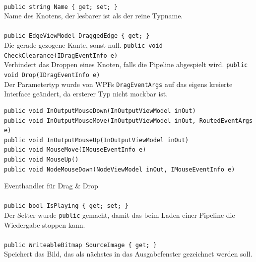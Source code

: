 \paragraph{}
\begin{itemize}
	\add \verb!public string Name { get; set; }! \\
	Name des Knotens, der lesbarer ist als der reine Typname.
\end{itemize}

\paragraph{}
\begin{itemize}
	\add \verb!public EdgeViewModel DraggedEdge { get; }! \\
	Die gerade gezogene Kante, sonst null.
	\add \verb!public void CheckClearance(IDragEventInfo e)! \\
	Verhindert das Droppen eines Knoten, falls die Pipeline abgespielt wird.
	\change \verb!public void Drop(IDragEventInfo e)! \\
	Der Parametertyp wurde von WPFs \verb!DragEventArgs! auf das eigens kreierte Interface  geändert, da ersterer Typ nicht mockbar ist.
	\add \begin{verbatim}
public void InOutputMouseDown(InOutputViewModel inOut)
public void InOutputMouseMove(InOutputViewModel inOut, RoutedEventArgs e)
public void InOutputMouseUp(InOutputViewModel inOut)
public void MouseMove(IMouseEventInfo e)
public void MouseUp()
public void NodeMouseDown(NodeViewModel inOut, IMouseEventInfo e)
	\end{verbatim}
	Eventhandler für Drag \& Drop
\end{itemize}

\paragraph{}
\begin{itemize}
	\change \verb!public bool IsPlaying { get; set; }! \\
	Der Setter wurde \verb!public! gemacht, damit das  beim Laden einer Pipeline die Wiedergabe stoppen kann.
\end{itemize}

\paragraph{}
\begin{itemize}
	\add \verb!public WriteableBitmap SourceImage { get; }! \\
	Speichert das Bild, das als nächstes in das Ausgabefenster gezeichnet werden soll.
\end{itemize}
\newpage

